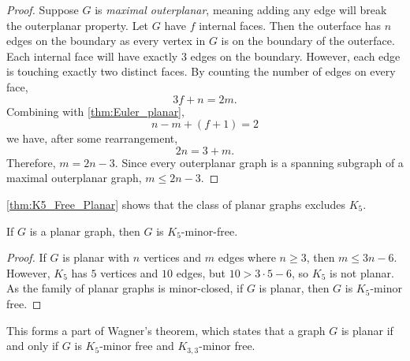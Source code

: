 \begin{proof}
	Suppose \(G\) is \textit{maximal outerplanar}, meaning adding any edge will break the outerplanar property. Let $G$ have \(f\) internal faces. Then the outerface has \(n\) edges on the boundary as every vertex in $G$ is on the boundary of the outerface. Each internal face will have exactly \(3\) edges on the boundary. However, each edge is touching exactly two distinct faces. By counting the number of edges on every face,
	\begin{equation*}
		3 f + n = 2m.
	\end{equation*}
	Combining with \cref{thm:Euler_planar},
	\begin{equation*}
		n - m + (f + 1) = 2
	\end{equation*}
	we have, after some rearrangement,
	\begin{equation*}
		2n = 3 + m.
	\end{equation*}
	Therefore, \(m = 2n - 3\). Since every outerplanar graph is a spanning subgraph of a maximal outerplanar graph, \(m \leq 2n - 3\).
\end{proof}
\cref{thm:K5_Free_Planar} shows that the class of planar graphs excludes $K_5$. 
\begin{lemma}\label{thm:K5_Free_Planar}
	If \(G\) is a planar graph, then \(G\) is \(K_5\)-minor-free.
\end{lemma}
\begin{proof}
	If \(G\) is planar with \(n\) vertices and \(m\) edges where $n \geq 3$, then \(m \leq 3n -6\).
	However, \(K_5\) has \(5\) vertices and \(10\) edges, but  \( 10 > 3 \cdot 5 - 6\), so \(K_5\) is not planar. As the family of planar graphs is minor-closed, if \(G\) is planar, then $G$ is \(K_5\)-minor free.
\end{proof}

This forms a part of Wagner's theorem, which states that a graph $G$ is planar if and only if $G$ is $K_5$-minor free and $K_{3,3}$-minor free. 